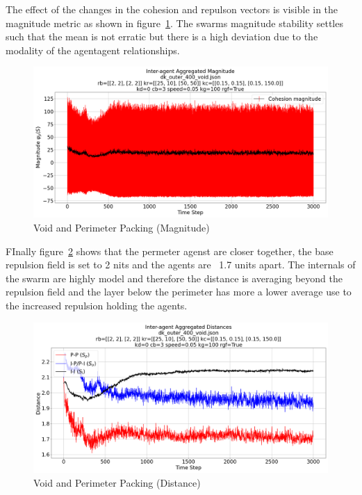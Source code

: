 \documentclass[12pt,a4paper]{IEEEtran}
\begin{document}
The effect of the changes in the cohesion and repulson vectors is visible in the magnitude metric as shown in figure~\ref{fig:voidPerimMagnitude}. The swarms magnitude stability settles such that the mean is not erratic but there is a high deviation due to the modality of the agent\textrightarrow agent relationships.

\begin{figure}[H]
	\begin{center}
		\includegraphics[width=1.0\linewidth]{figures/voidPerimMagnitude}
	\end{center}
	\caption{Void and Perimeter Packing (Magnitude)\label{fig:voidPerimMagnitude}}
\end{figure}

FInally figure~\ref{fig:voidPerimDistance} shows that the permeter agenst are closer together, the base repulsion field is set to 2 nits and the agents are ~1.7 units apart. The internals of the swarm are highly model and therefore the distance is averaging beyond the repulsion field and the layer below the perimeter has more a lower average use to the increased repulsion holding the agents.

\begin{figure}[H]
	\begin{center}
		\includegraphics[width=1.0\linewidth]{figures/voidPerimDistance}
	\end{center}
	\caption{Void and Perimeter Packing (Distance)\label{fig:voidPerimDistance}}
\end{figure}
\end{document}
